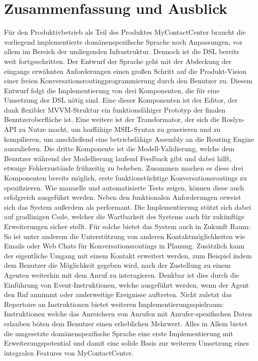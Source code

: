 \chapter{Zusammenfassung und Ausblick}
Für den Produktivbetrieb als Teil des Produktes MyContactCenter braucht die vorliegend implementierte domänenspezifische Sprache noch Anpassungen, vor allem im Bereich der umliegenden Infrastruktur. 
Dennoch ist die DSL bereits weit fortgeschritten. Der Entwurf der Sprache geht mit der Abdeckung der eingangs erwähnten Anforderungen einen großen Schritt auf die Produkt-Vision einer freien Konversationsroutingprogrammierung durch den Benutzer zu. Diesem Entwurf folgt die Implementierung von drei Komponenten, die für eine Umsetzung der DSL nötig sind. Eine dieser Komponenten ist der Editor, der dank flexibler MVVM-Struktur ein funktionsfähiger Prototyp der finalen Benutzeroberfläche ist. Eine weitere ist der Transformator, der sich die Roslyn-API zu Nutze macht, um lauffähige MSIL-Syntax zu generieren und zu kompilieren, um anschließend eine betriebsfähige Assembly an die Routing Engine auszuliefern. Die dritte Komponente ist die  Modell-Validierung, welche dem Benutzer während der Modellierung laufend Feedback gibt und dabei hilft, etwaige Fehlerzustände frühzeitig zu beheben. 
\newline
Zusammen machen es diese drei Komponenten bereits möglich, erste funktionstüchtige Konversationsroutings zu spezifizieren. Wie manuelle und automatisierte Tests zeigen, können diese auch erfolgreich ausgeführt werden. Neben den funktionalen Anforderungen erweist sich das System außerdem als performant. Die Implementierung stützt sich dabei auf gradlinigen Code, welcher die Wartbarkeit des Systems auch für zukünftige Erweiterungen sicher stellt. 
\newline
Für solche bietet das System auch in Zukunft Raum: So ist unter anderem die Unterstützung von anderen Kontaktmöglichkeiten wie Emails oder Web Chats für Konversationsroutings in Planung. Zusätzlich kann der eigentliche Umgang mit einem Kontakt erweitert werden, zum Beispiel indem dem Benutzer die Möglichkeit gegeben wird, nach der Zustellung zu einem Agenten weiterhin mit dem Anruf zu interagieren. Denkbar ist dies durch die Einführung von Event-Instruktionen, welche ausgeführt werden, wenn der Agent den Ruf annimmt oder anderweitige Ereignisse auftreten. Nicht zuletzt das Repertoire an Instruktionen bietet weiteren Implementierungsspielraum: Instruktionen welche das Anreichern von Anrufen mit Anrufer-spezifischen Daten erlauben böten dem Benutzer einen erheblichen Mehrwert. Alles in Allem bietet die umgesetzte domänenspezifische Sprache eine erste Implementierung mit Erweiterungspotential und damit eine solide Basis zur weiteren 
Umsetzung eines integralen Features von MyContactCenter.